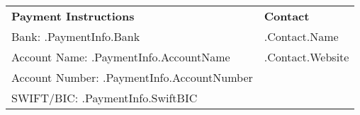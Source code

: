 \documentclass{article}
\begin{document}
\vspace{3cm}

\begin{tabular}{@{}p{}p{}@{}}
    \textbf{Payment Instructions} & \textbf{Contact} \\
    Bank: {{ .PaymentInfo.Bank }} & {{ .Contact.Name }}\\
    Account Name: {{ .PaymentInfo.AccountName }} & {{ .Contact.Website }} \\
    Account Number: {{ .PaymentInfo.AccountNumber }} & \\
    SWIFT/BIC: {{ .PaymentInfo.SwiftBIC }} & \\
\end{tabular}

\vspace{1cm}
\end{document}
